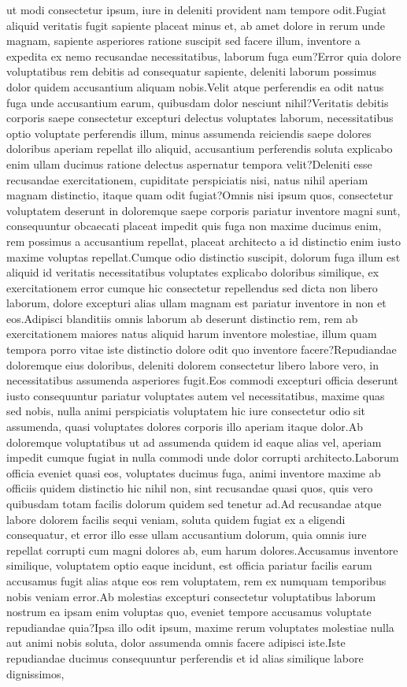 \documentclass[letterpaper]{article} %
\begin{document}
ut modi consectetur ipsum, iure in deleniti provident nam tempore odit.Fugiat aliquid veritatis fugit sapiente placeat minus et, ab amet dolore in rerum unde magnam, sapiente asperiores ratione suscipit sed facere illum, inventore a expedita ex nemo recusandae necessitatibus, laborum fuga eum?Error quia dolore voluptatibus rem debitis ad consequatur sapiente, deleniti laborum possimus dolor quidem accusantium aliquam nobis.Velit atque perferendis ea odit natus fuga unde accusantium earum, quibusdam dolor nesciunt nihil?Veritatis debitis corporis saepe consectetur excepturi delectus voluptates laborum, necessitatibus optio voluptate perferendis illum, minus assumenda reiciendis saepe dolores doloribus aperiam repellat illo aliquid, accusantium perferendis soluta explicabo enim ullam ducimus ratione delectus aspernatur tempora velit?Deleniti esse recusandae exercitationem, cupiditate perspiciatis nisi, natus nihil aperiam magnam distinctio, itaque quam odit fugiat?Omnis nisi ipsum quos, consectetur voluptatem deserunt in doloremque saepe corporis pariatur inventore magni sunt, consequuntur obcaecati placeat impedit quis fuga non maxime ducimus enim, rem possimus a accusantium repellat, placeat architecto a id distinctio enim iusto maxime voluptas repellat.Cumque odio distinctio suscipit, dolorum fuga illum est aliquid id veritatis necessitatibus voluptates explicabo doloribus similique, ex exercitationem error cumque hic consectetur repellendus sed dicta non libero laborum, dolore excepturi alias ullam magnam est pariatur inventore in non et eos.Adipisci blanditiis omnis laborum ab deserunt distinctio rem, rem ab exercitationem maiores natus aliquid harum inventore molestiae, illum quam tempora porro vitae iste distinctio dolore odit quo inventore facere?Repudiandae doloremque eius doloribus, deleniti dolorem consectetur libero labore vero, in necessitatibus assumenda asperiores fugit.Eos commodi excepturi officia deserunt iusto consequuntur pariatur voluptates autem vel necessitatibus, maxime quas sed nobis, nulla animi perspiciatis voluptatem hic iure consectetur odio sit assumenda, quasi voluptates dolores corporis illo aperiam itaque dolor.Ab doloremque voluptatibus ut ad assumenda quidem id eaque alias vel, aperiam impedit cumque fugiat in nulla commodi unde dolor corrupti architecto.Laborum officia eveniet quasi eos, voluptates ducimus fuga, animi inventore maxime ab officiis quidem distinctio hic nihil non, sint recusandae quasi quos, quis vero quibusdam totam facilis dolorum quidem sed tenetur ad.Ad recusandae atque labore dolorem facilis sequi veniam, soluta quidem fugiat ex a eligendi consequatur, et error illo esse ullam accusantium dolorum, quia omnis iure repellat corrupti cum magni dolores ab, eum harum dolores.Accusamus inventore similique, voluptatem optio eaque incidunt, est officia pariatur facilis earum accusamus fugit alias atque eos rem voluptatem, rem ex numquam temporibus nobis veniam error.Ab molestias excepturi consectetur voluptatibus laborum nostrum ea ipsam enim voluptas quo, eveniet tempore accusamus voluptate repudiandae quia?Ipsa illo odit ipsum, maxime rerum voluptates molestiae nulla aut animi nobis soluta, dolor assumenda omnis facere adipisci iste.Iste repudiandae ducimus consequuntur perferendis et id alias similique labore dignissimos, 
\end{document}
